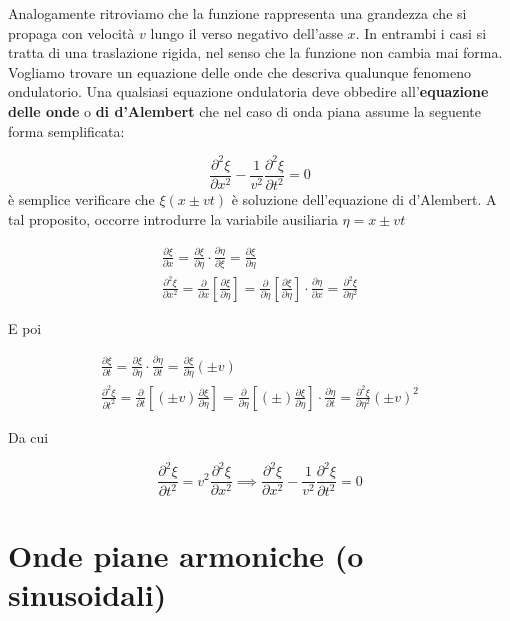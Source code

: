 Analogamente ritroviamo che la funzione rappresenta una grandezza che si propaga con velocità $v$ lungo il verso negativo dell'asse $x$.
In entrambi i casi si tratta di una traslazione rigida, nel senso che la funzione non cambia mai forma.
Vogliamo trovare un equazione delle onde che descriva qualunque fenomeno ondulatorio. Una qualsiasi equazione ondulatoria deve obbedire all'\textbf{equazione delle onde} o \textbf{di d'Alembert} che nel caso di onda piana assume la seguente forma semplificata:

\[
	\frac{\partial^2 \xi}{\partial x^2}  - \frac{1}{v^2} \frac{\partial^2 \xi}{\partial t^2} = 0
\]
è semplice verificare che $ \xi(x\pm vt) $ è soluzione dell'equazione di d'Alembert. A tal proposito, occorre introdurre la variabile ausiliaria $ \eta = x \pm vt $

\begin{gather*}
	\frac{\partial \xi}{\partial x} = \frac{\partial \xi}{\partial \eta} \cdot \frac{\partial \eta}{\partial \xi} = \frac{\partial \xi}{\partial \eta}\\
	\frac{\partial^2 \xi}{\partial x^2} = \frac{\partial}{\partial x} \left[ \frac{\partial \xi}{\partial \eta}  \right] = \frac{\partial}{\partial \eta} \left[ \frac{\partial \xi}{\partial \eta}  \right] \cdot \frac{\partial \eta}{\partial x} = \frac{\partial^2 \xi}{\partial \eta^2}
\end{gather*}

E poi

\begin{gather*}
	\frac{\partial \xi}{\partial t} = \frac{\partial \xi}{\partial \eta} \cdot \frac{\partial \eta}{\partial t} = \frac{\partial \xi}{\partial \eta} (\pm v)\\
	\frac{\partial^2 \xi}{\partial t^2} = \frac{\partial}{\partial t} \left[ (\pm v)\frac{\partial \xi}{\partial \eta}  \right] = \frac{\partial}{\partial \eta} \left[ (\pm )\frac{\partial \xi}{\partial \eta}  \right] \cdot \frac{\partial \eta}{\partial t} = \frac{\partial^2 \xi}{\partial \eta^2} (\pm v)^2
\end{gather*}

Da cui

\[
	\frac{\partial^2 \xi}{\partial t^2} = v^2 \frac{\partial^2 \xi}{\partial x^2} \implies \boxed{\frac{\partial^2 \xi}{\partial x^2} -\frac{1}{v^2}\frac{\partial^2 \xi}{\partial t^2} = 0}
\]

\section{Onde piane armoniche (o sinusoidali)}

